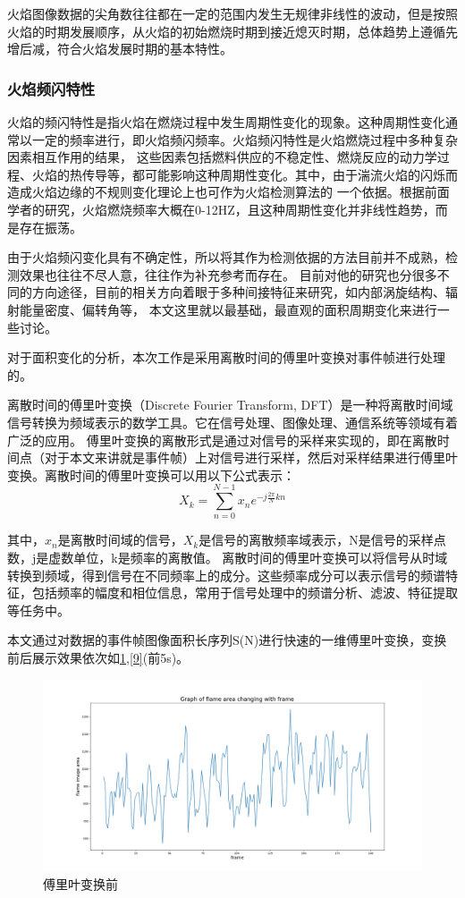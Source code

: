 火焰图像数据的尖角数往往都在一定的范围内发生无规律非线性的波动，但是按照火焰的时期发展顺序，从火焰的初始燃烧时期到接近熄灭时期，总体趋势上遵循先增后减，符合火焰发展时期的基本特性。

\subsubsection{火焰频闪特性}
火焰的频闪特性是指火焰在燃烧过程中发生周期性变化的现象。这种周期性变化通常以一定的频率进行，即火焰频闪频率。火焰频闪特性是火焰燃烧过程中多种复杂因素相互作用的结果，
这些因素包括燃料供应的不稳定性、燃烧反应的动力学过程、火焰的热传导等，都可能影响这种周期性变化。其中，由于湍流火焰的闪烁而造成火焰边缘的不规则变化理论上也可作为火焰检测算法的
一个依据。根据前面学者的研究，火焰燃烧频率大概在0-12HZ，且这种周期性变化并非线性趋势，而是存在振荡。

由于火焰频闪变化具有不确定性，所以将其作为检测依据的方法目前并不成熟，检测效果也往往不尽人意，往往作为补充参考而存在。
目前对他的研究也分很多不同的方向途径，目前的相关方向着眼于多种间接特征来研究，如内部涡旋结构、辐射能量密度、偏转角等，
本文这里就以最基础，最直观的面积周期变化来进行一些讨论。

对于面积变化的分析，本次工作是采用离散时间的傅里叶变换对事件帧进行处理的。

离散时间的傅里叶变换（Discrete Fourier Transform, DFT）\cite{fly}是一种将离散时间域信号转换为频域表示的数学工具。它在信号处理、图像处理、通信系统等领域有着广泛的应用。
傅里叶变换的离散形式是通过对信号的采样来实现的，即在离散时间点（对于本文来讲就是事件帧）上对信号进行采样，然后对采样结果进行傅里叶变换。离散时间的傅里叶变换可以用以下公式表示：
\begin{equation} 
    X_k=\sum_{n=0}^{N-1}x_n e^{-j\frac{2\pi}{N}kn}
\end{equation}

其中，$x_n$是离散时间域的信号，$X_k$是信号的离散频率域表示，N是信号的采样点数，j是虚数单位，k是频率的离散值。
离散时间的傅里叶变换可以将信号从时域转换到频域，得到信号在不同频率上的成分。这些频率成分可以表示信号的频谱特征，包括频率的幅度和相位信息，常用于信号处理中的频谱分析、滤波、特征提取等任务中。

本文通过对数据的事件帧图像面积长序列S(N)进行快速的一维傅里叶变换，变换前后展示效果依次如\ref{8},\ref{9}(前5s)。
    \begin{figure}[ht]
      \centering
      \includegraphics[width=\textwidth]{figures/extract_flicker_01.png}
      \caption{傅里叶变换前}
      \label{8}
    \end{figure}
    
